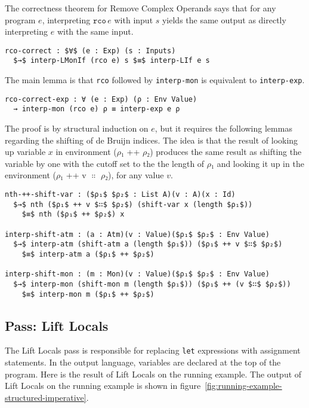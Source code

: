 \documentclass[sigplan,review,dvipsnames,screen,10pt]{acmart}
\begin{document}
The correctness theorem for Remove Complex Operands says that for any
program $e$, interpreting $\mathtt{rco}\,e$ with input $s$ yields the
same output as directly interpreting $e$ with the same input.

\begin{lstlisting}
rco-correct : $∀$ (e : Exp) (s : Inputs)
  $→$ interp-LMonIf (rco e) s $≡$ interp-LIf e s 
\end{lstlisting}

The main lemma is that \lstinline{rco} followed by
\lstinline{interp-mon} is equivalent to \lstinline{interp-exp}.

\begin{lstlisting}
rco-correct-exp : ∀ (e : Exp) (ρ : Env Value)
  → interp-mon (rco e) ρ ≡ interp-exp e ρ
\end{lstlisting}

The proof is by structural induction on $e$, but it requires the
following lemmas regarding the shifting of de Bruijn indices.
The idea is that the result of looking up variable $x$ in
environment ($ρ₁$ ++ $ρ₂$) produces the same result as
shifting the variable by one with the cutoff set to the
the length of $ρ₁$ and looking it up in the environment
($ρ₁$ ++ v $∷$ $ρ₂$), for any value $v$.

\begin{lstlisting}[basicstyle=\ttfamily\footnotesize]
nth-++-shift-var : ($ρ₁$ $ρ₂$ : List A)(v : A)(x : Id)
  $→$ nth ($ρ₁$ ++ v $∷$ $ρ₂$) (shift-var x (length $ρ₁$))
    $≡$ nth ($ρ₁$ ++ $ρ₂$) x

interp-shift-atm : (a : Atm)(v : Value)($ρ₁$ $ρ₂$ : Env Value)
  $→$ interp-atm (shift-atm a (length $ρ₁$)) ($ρ₁$ ++ v $∷$ $ρ₂$) 
    $≡$ interp-atm a ($ρ₁$ ++ $ρ₂$) 

interp-shift-mon : (m : Mon)(v : Value)($ρ₁$ $ρ₂$ : Env Value)
  $→$ interp-mon (shift-mon m (length $ρ₁$)) ($ρ₁$ ++ (v $∷$ $ρ₂$))
    $≡$ interp-mon m ($ρ₁$ ++ $ρ₂$)
\end{lstlisting}


\subsection{Pass: Lift Locals}

The Lift Locals pass is responsible for replacing \lstinline{let}
expressions with assignment statements. In the output language,
variables are declared at the top of the program.  Here is the result
of Lift Locals on the running example. The output of Lift Locals on
the running example is shown in
figure~\ref{fig:running-example-structured-imperative}.
\end{document}
